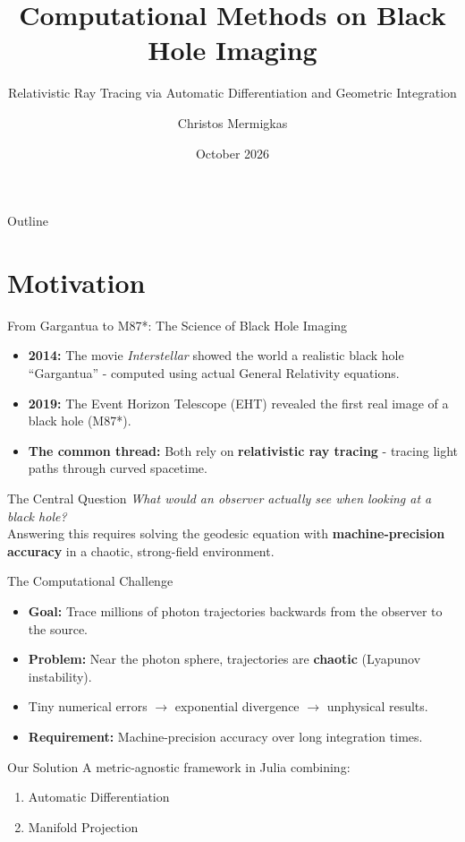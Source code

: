 \documentclass[10pt, aspectratio=169]{beamer}
\author{Christos Mermigkas}
\title{Computational Methods on Black Hole Imaging}
\subtitle{Relativistic Ray Tracing via Automatic Differentiation and Geometric Integration}
\institute{Aristotle University of Thessaloniki \\ Computational Physics MSc}
\date{October 2026}
\begin{document}
	
	\begin{frame}
		\titlepage
	\end{frame}
	
	\begin{frame}{Outline}
		\tableofcontents
	\end{frame}
	
	\section{Motivation}
	
	\begin{frame}{From Gargantua to M87*: The Science of Black Hole Imaging}
		\begin{itemize}
			\item \textbf{2014:} The movie \textit{Interstellar} showed the world a realistic black hole ``Gargantua'' - computed using actual General Relativity equations.
			\item \textbf{2019:} The Event Horizon Telescope (EHT) revealed the first real image of a black hole (M87*).
			\item \textbf{The common thread:} Both rely on \textbf{relativistic ray tracing} - tracing light paths through curved spacetime.
		\end{itemize}
		\vspace{0.3cm}
		\begin{block}{The Central Question}
			\textit{What would an observer actually see when looking at a black hole?} \\[0.2cm]
			Answering this requires solving the geodesic equation with \textbf{machine-precision accuracy} in a chaotic, strong-field environment.
		\end{block}
	\end{frame}
	
	\begin{frame}{The Computational Challenge}
		\begin{itemize}
			\item \textbf{Goal:} Trace millions of photon trajectories backwards from the observer to the source.
			\item \textbf{Problem:} Near the photon sphere, trajectories are \textbf{chaotic} (Lyapunov instability).
			\item Tiny numerical errors $\rightarrow$ exponential divergence $\rightarrow$ unphysical results.
			\item \textbf{Requirement:} Machine-precision accuracy over long integration times.
		\end{itemize}
		\vspace{0.3cm}
		\begin{block}{Our Solution}
			A metric-agnostic framework in Julia combining:
			\begin{enumerate}
				\item Automatic Differentiation
				\item Manifold Projection
			\end{enumerate}
		\end{block}
	\end{frame}
\end{document}
